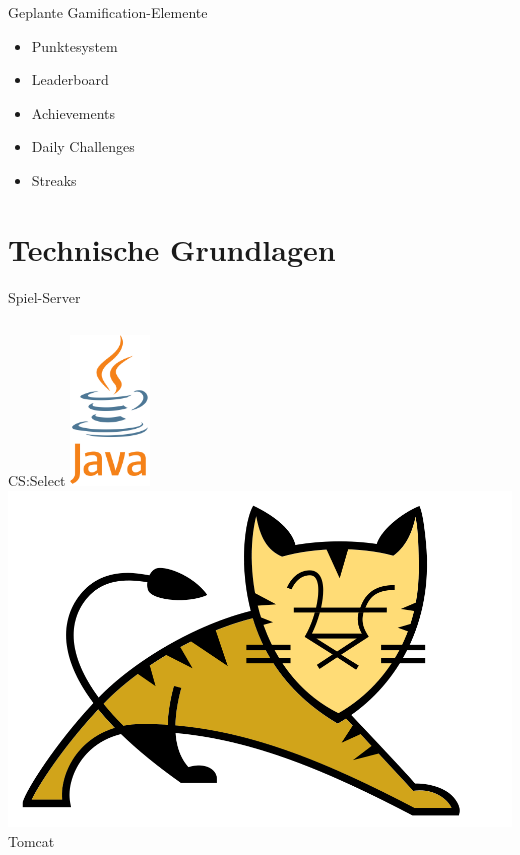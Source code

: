\documentclass[xcolor=dvipsnames]{beamer}
\begin{document}
\begin{frame}{Geplante Gamification-Elemente}
    \begin{itemize}
        \item Punktesystem
        \item Leaderboard
        \item Achievements
        \item Daily Challenges
        \item Streaks
    \end{itemize}
\end{frame}
\section{Technische Grundlagen}
\begin{frame}{Spiel-Server}
\begin{columns}
\begin{column}{0.5\textwidth}
         \begin{block}{CS:Select}
                \center
                \includegraphics[height=4cm]{img/java.png}\\
                \includegraphics[width=(\textwidth) / 2]{img/tomcat.png}
                Tomcat
            \end{block} 

\end{column}
\end{columns}
\end{frame}
\end{document}
